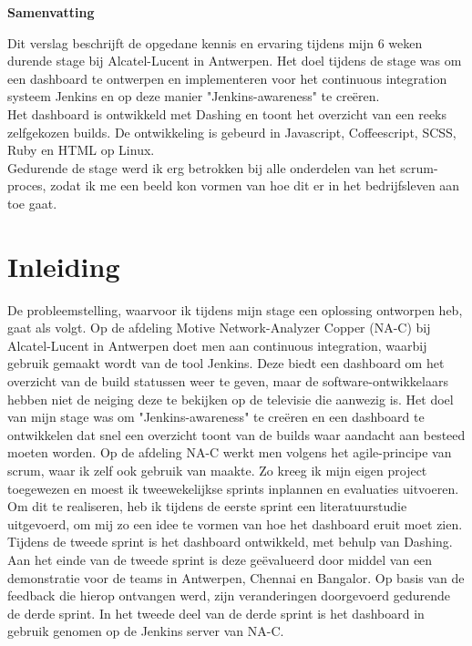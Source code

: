 \documentclass[10pt,a4paper]{article}
\begin{document}
\begin{center}
\textbf{Samenvatting}\\
\end{center}
Dit verslag beschrijft de opgedane kennis en ervaring tijdens mijn 6 weken durende stage bij Alcatel-Lucent in Antwerpen. Het doel tijdens de stage was om een dashboard te ontwerpen en implementeren voor het continuous integration systeem Jenkins en op deze manier "Jenkins-awareness" te cre\"eren.\\
Het dashboard is ontwikkeld met Dashing en toont het overzicht van een reeks zelfgekozen builds. De ontwikkeling is gebeurd in Javascript, Coffeescript, SCSS, Ruby en HTML op Linux.\\
Gedurende de stage werd ik erg betrokken bij alle onderdelen van het scrum-proces, zodat ik me een beeld kon vormen van hoe dit er in het bedrijfsleven aan toe gaat.

\tableofcontents
\clearpage

\section{Inleiding}
De probleemstelling, waarvoor ik tijdens mijn stage een oplossing ontworpen heb, gaat als volgt. Op de afdeling Motive Network-Analyzer Copper (NA-C) bij Alcatel-Lucent in Antwerpen doet men aan continuous integration, waarbij gebruik gemaakt wordt van de tool Jenkins. Deze biedt een dashboard om het overzicht van de build statussen weer te geven, maar de software-ontwikkelaars hebben niet de neiging deze te bekijken op de televisie die aanwezig is. Het doel van mijn stage was om "Jenkins-awareness" te cre\"eren en een dashboard te ontwikkelen dat snel een overzicht toont van de builds waar aandacht aan besteed moeten worden. Op de afdeling NA-C werkt men volgens het agile-principe van scrum, waar ik zelf ook gebruik van maakte. Zo kreeg ik mijn eigen project toegewezen en moest ik tweewekelijkse sprints inplannen en evaluaties uitvoeren.\\

Om dit te realiseren, heb ik tijdens de eerste sprint een literatuurstudie uitgevoerd, om mij zo een idee te vormen van hoe het dashboard eruit moet zien. Tijdens de tweede sprint is het dashboard ontwikkeld, met behulp van Dashing. Aan het einde van de tweede sprint is deze ge\"evalueerd door middel van een demonstratie voor de teams in Antwerpen, Chennai en Bangalor. Op basis van de feedback die hierop ontvangen werd, zijn veranderingen doorgevoerd gedurende de derde sprint. In het tweede deel van de derde sprint is het dashboard in gebruik genomen op de Jenkins server van NA-C.\\
\end{document}
